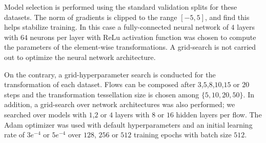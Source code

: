 Model selection is performed using the standard validation splits for these datasets. The norm of gradients is clipped to the range $[-5, 5]$, and find this helps stabilize training. 
In this case a fully-connected neural network of $4$ layers with $64$ neurons per layer with ReLu activation function was chosen to compute the parameters of the element-wise transformations. A grid-search is not carried out to optimize the neural network architecture.

On the contrary, a grid-hyperparameter search is conducted for the transformation of each dataset. Flows can be composed after $3$,$5$,$8$,$10$,$15$ or $20$ steps and the transformation tessellation size is chosen among $\{5,10,20,50\}$.
In addition, a grid-search over network architectures was also performed; we searched over models with $1$,$2$ or $4$ layers with $8$ or $16$ hidden layers per flow.
The Adam optimizer \cite{kingma2014adam} was used with default hyperparameters and an initial learning rate of $3e^{-4}$ or $5e^{-4}$ over $128$, $256$ or $512$ training epochs with batch size $512$. 

